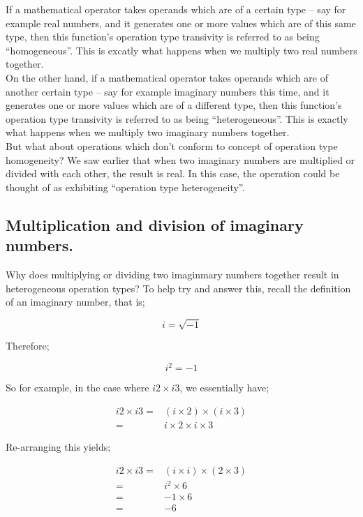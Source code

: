 \documentclass{article}
\begin{document}
If a mathematical operator takes operands which are of a certain type -- say for example real numbers, and it
generates one or more values which are of this same type, then this function's operation type transivity is
referred to as being ``homogeneous''. This is excatly what happens when we multiply two real numbers together.\\

On the other hand, if a mathematical operator takes operands which are of another certain type -- say for example 
imaginary numbers this time, and it generates one or more values which are of a different type, then this function's 
operation type transivity is referred to as being ``heterogeneous''. This is exactly what happens when we multiply two
imaginary numbers together.\\

But what about operations which don't conform to concept of operation type homogeneity? We saw earlier that when 
two imaginary numbers are multiplied or divided with each other, the result is real. In this case, the operation
could be thought of as exhibiting ``operation type heterogeneity''.


\subsection{Multiplication and division of imaginary numbers.}

Why does multiplying or dividing two imaginmary numbers together result in heterogeneous operation types?
To help try and answer this, recall the definition of an imaginary number, that is;

\begin{equation*}
i = \sqrt{-1}
\end{equation*}

Therefore;

\begin{equation*}
i^{2} = -1
\end{equation*}

So for example, in the case where $i2 \times i3$, we essentially have;

\begin{align*}
i2 \times i3 =&  (i \times 2) \times (i \times 3) \\
             =&  i \times 2 \times i \times 3
\end{align*}

Re-arranging this yields;

\begin{align*}
i2 \times i3 =&  (i \times i) \times (2 \times 3) \\
             =&  i^{2} \times 6 \\
             =&  -1 \times 6 \\
             =&  -6
\end{align*}
\end{document}
